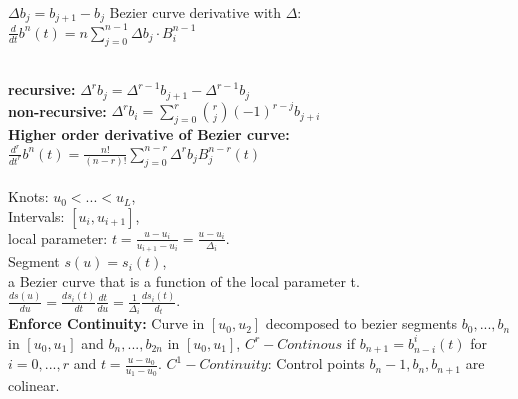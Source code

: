  $\Delta b_j = b_{j+1} - b_j$
Bezier curve derivative with $\Delta$: \\ $\frac{d}{dt}b^n(t) = n\sum_{j=0}^{n-1} \Delta b_j \cdot B_i^{n-1}$


 \\
\textbf{recursive:} $\Delta^r b_j = \Delta^{r-1}b_{j+1} - \Delta^{r-1}b_j$\\
\textbf{non-recursive:} $\Delta^r b_i = \sum_{j=0}^r \binom{r}{j} (-1)^{r-j} b_{j+i}$\\
\textbf{Higher order derivative of Bezier curve:} $\frac{d^r}{dt^r} b^n(t) = \frac{n!}{(n-r)!} \sum_{j=0}^{n-r} \Delta^r b_j B_j^{n-r}(t)$\\
\\
Knots: $u_0 < ... <u_L$, \\
Intervals: $[u_i, u_{i+1}]$, \\
local parameter: $t = \frac{u - u_i}{u_{i+1} - u_i} = \frac{u - u_i}{\Delta_i}$. \\
Segment $s(u) = s_i(t)$, \\
a Bezier curve that is a function of the local parameter t.
$\frac{ds(u)}{du} = \frac{ds_i(t)}{dt}\frac{dt}{du} = \frac{1}{\Delta_i}\frac{ds_i(t)}{d_t}$. \\
\textbf{Enforce Continuity:} Curve in $[u_0, u_2]$ decomposed to bezier segments $b_0, ..., b_n$ in $[u_0, u_1]$ and $b_n, ..., b_{2n}$ in $[u_0, u_1]$, $C^r-Continous$ if $b_{n+1} = b_{n-i}^i(t)$ for $i = 0,...,r$ and $t = \frac{u - u_0}{u_1 - u_0 }$. $C^1-Continuity$: Control points $b_n-1, b_n, b_{n+1}$ are colinear. 

